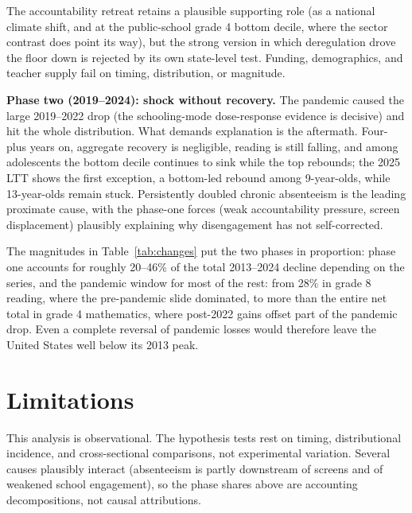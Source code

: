 \documentclass[11pt]{article}
\begin{document}
The accountability retreat retains a plausible supporting role (as a national climate shift, and at the public-school grade 4 bottom decile, where the sector contrast does point its way), but the strong version in which deregulation drove the floor down is rejected by its own state-level test. Funding, demographics, and teacher supply fail on timing, distribution, or magnitude.

\textbf{Phase two (2019--2024): shock without recovery.} The pandemic caused the large 2019--2022 drop (the schooling-mode dose-response evidence is decisive) and hit the whole distribution. What demands explanation is the aftermath. Four-plus years on, aggregate recovery is negligible, reading is still falling, and among adolescents the bottom decile continues to sink while the top rebounds; the 2025 LTT shows the first exception, a bottom-led rebound among 9-year-olds, while 13-year-olds remain stuck. Persistently doubled chronic absenteeism is the leading proximate cause, with the phase-one forces (weak accountability pressure, screen displacement) plausibly explaining why disengagement has not self-corrected.

The magnitudes in Table~\ref{tab:changes} put the two phases in proportion: phase one accounts for roughly 20--46\% of the total 2013--2024 decline depending on the series, and the pandemic window for most of the rest: from 28\% in grade 8 reading, where the pre-pandemic slide dominated, to more than the entire net total in grade 4 mathematics, where post-2022 gains offset part of the pandemic drop. Even a complete reversal of pandemic losses would therefore leave the United States well below its 2013 peak.

\section{Limitations}

This analysis is observational. The hypothesis tests rest on timing, distributional incidence, and cross-sectional comparisons, not experimental variation. Several causes plausibly interact (absenteeism is partly downstream of screens and of weakened school engagement), so the phase shares above are accounting decompositions, not causal attributions.
\end{document}
